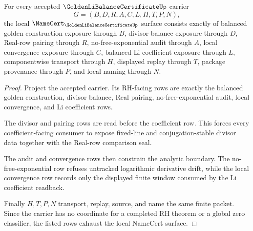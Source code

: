 \begin{theorem}
\label{thm:golden-li-balance-certificate-namecert-obligations}
For every accepted $\GoldenLiBalanceCertificateUp$ carrier
$$
G=(B,D,R,A,C,L,H,T,P,N),
$$
the local $\NameCert_{\GoldenLiBalanceCertificateUp}$ surface consists exactly of balanced golden construction exposure through $B$, divisor balance exposure through $D$, Real-row pairing through $R$, no-free-exponential audit through $A$, local convergence exposure through $C$, balanced Li coefficient exposure through $L$, componentwise transport through $H$, displayed replay through $T$, package provenance through $P$, and local naming through $N$.
\end{theorem}
\begin{proof}
Project the accepted carrier. Its RH-facing rows are exactly the balanced golden construction, divisor balance, Real pairing, no-free-exponential audit, local convergence, and Li coefficient rows.

The divisor and pairing rows are read before the coefficient row. This forces every coefficient-facing consumer to expose fixed-line and conjugation-stable divisor data together with the Real-row comparison seal.

The audit and convergence rows then constrain the analytic boundary. The no-free-exponential row refuses untracked logarithmic derivative drift, while the local convergence row records only the displayed finite window consumed by the Li coefficient readback.

Finally $H,T,P,N$ transport, replay, source, and name the same finite packet. Since the carrier has no coordinate for a completed RH theorem or a global zero classifier, the listed rows exhaust the local NameCert surface.
\end{proof}

